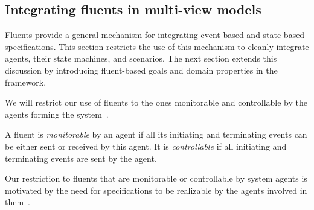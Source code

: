 \subsection{Integrating fluents in multi-view models}

Fluents provide a general mechanism for integrating event-based and state-based specifications. This section restricts the use of this mechanism to cleanly integrate agents, their state machines, and scenarios. The next section extends this discussion by introducing fluent-based goals and domain properties in the framework.

We will restrict our use of fluents to the ones monitorable and controllable by the agents forming the system~\cite{Letier:2002}. 

A fluent is \emph{monitorable} by an agent if all its initiating and terminating events can be either sent or received by this agent. It is \emph{controllable} if all initiating and terminating events are sent by the agent. 

Our restriction to fluents that are monitorable or controllable by system agents is motivated by the need for specifications  to be realizable by the agents involved in them~\cite{Letier:2002}.
